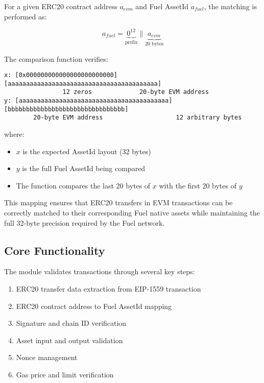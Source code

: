 For a given ERC20 contract address $a_{evm}$ and Fuel AssetId $a_{fuel}$, the matching is performed as:

\[ a_{fuel} = \underbrace{0^{12}}_\text{prefix} \parallel \underbrace{a_{evm}}_\text{20 bytes} \]

The comparison function verifies:
\begin{small}
\begin{verbatim}
x: [0x000000000000000000000000][aaaaaaaaaaaaaaaaaaaaaaaaaaaaaaaaaaaaaaaaa]
                12 zeros             20-byte EVM address
y: [aaaaaaaaaaaaaaaaaaaaaaaaaaaaaaaaaaaaaaaaa][bbbbbbbbbbbbbbbbbbbbbbbbbbbbbbbb]
        20-byte EVM address                    12 arbitrary bytes
\end{verbatim}
\end{small}

where:
\begin{itemize}
    \item $x$ is the expected AssetId layout (32 bytes)
    \item $y$ is the full Fuel AssetId being compared
    \item The function compares the last 20 bytes of $x$ with the first 20 bytes of $y$
\end{itemize}

This mapping ensures that ERC20 transfers in EVM transactions can be correctly matched to their corresponding Fuel native
assets while maintaining the full 32-byte precision required by the Fuel network.\\







\subsection{Core Functionality}
The module validates transactions through several key steps:
\begin{enumerate}
    \item ERC20 transfer data extraction from EIP-1559 transaction
    \item ERC20 contract address to Fuel AssetId mapping
    \item Signature and chain ID verification
    \item Asset input and output validation
    \item Nonce management
    \item Gas price and limit verification
\end{enumerate}

